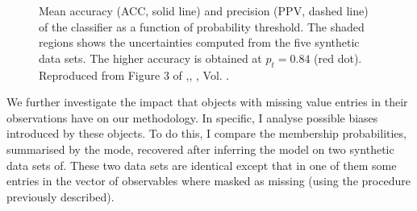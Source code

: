\begin{figure}[ht!]
\begin{center}
\caption{Mean accuracy (ACC, solid line) and precision (PPV, dashed line) of the classifier as a function of probability threshold. The shaded regions shows the uncertainties computed from the five synthetic data sets. The higher accuracy is obtained at $p_t=0.84$ (red dot). Reproduced from Figure 3 of \citet{Olivares2017},\textit{}, , Vol. .}
\label{fig:ACC}
\end{center}
\end{figure}

We further investigate the impact that objects with missing value entries in their observations have on our methodology. In specific, I analyse possible biases introduced by these objects. To do this, I compare the membership probabilities, summarised by the mode, recovered after inferring the model on two synthetic data sets of. These two data sets are identical except that in one of them some entries in the vector of observables where masked as missing (using the procedure previously described).

